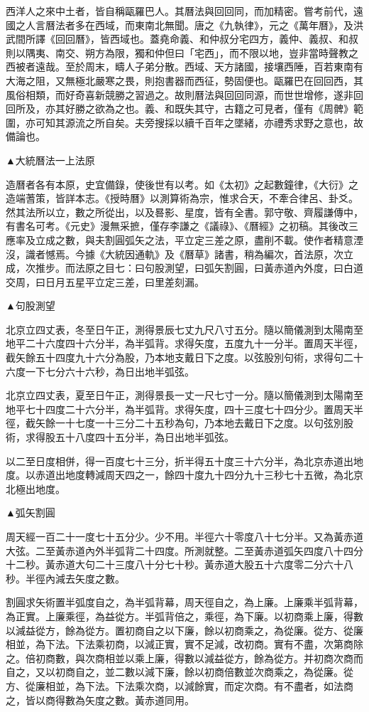 西洋人之來中土者，皆自稱甌羅巴人。其曆法與回回同，而加精密。嘗考前代，遠國之人言曆法者多在西域，而東南北無聞。唐之《九執律》，元之《萬年曆》，及洪武間所譯《回回曆》，皆西域也。蓋堯命義、和仲叔分宅四方，義仲、義叔、和叔則以隅夷、南交、朔方為限，獨和仲但曰「宅西」，而不限以地，豈非當時聲教之西被者遠哉。至於周末，疇人子弟分散。西域、天方諸國，接壤西陲，百若東南有大海之阻，又無極北嚴寒之畏，則抱書器而西征，勢固便也。甌羅巴在回回西，其風俗相類，而好奇喜新競勝之習過之。故則曆法與回回同源，而世世增修，遂非回回所及，亦其好勝之欲為之也。義、和既失其守，古籍之可見者，僅有《周髀》範圍，亦可知其源流之所自矣。夫旁搜採以續千百年之墜緒，亦禮秀求野之意也，故備論也。


▲大統曆法一上法原

造曆者各有本原，史宜備錄，使後世有以考。如《太初》之起數鐘律，《大衍》之造端蓍策，皆詳本志。《授時曆》以測算術為宗，惟求合天，不牽合律呂、卦爻。然其法所以立，數之所從出，以及晷影、星度，皆有全書。郭守敬、齊履謙傳中，有書名可考。《元史》漫無采摭，僅存李謙之《議祿》、《曆經》之初稿。其後改三應率及立成之數，與夫割圓弧矢之法，平立定三差之原，盡削不載。使作者精意湮沒，識者憾焉。今據《大統因通軌》及《曆草》諸書，稍為編次，首法原，次立成，次推步。而法原之目七：曰句股測望，曰弧矢割圓，曰黃赤道內外度，曰白道交周，曰日月五星平立定三差，曰里差刻漏。

▲句股測望

北京立四丈表，冬至日午正，測得景辰七丈九尺八寸五分。隨以簡儀測到太陽南至地平二十六度四十六分半，為半弧背。求得矢度，五度九十一分半。置周天半徑，截矢餘五十四度九十六分為股，乃本地支戴日下之度。以弦股別句術，求得句二十六度一下七分六十六秒，為日出地半弧弦。

北京立四丈表，夏至日午正，測得景長一丈一尺七寸一分。隨以簡儀測到太陽南至地平七十四度二十六分半，為半弧背。求得矢度，四十三度七十四分少。置周天半徑，截矢餘一十七度一十三分二十五秒為句，乃本地去戴日下之度。以句弦別股術，求得股五十八度四十五分半，為日出地半弧弦。

以二至日度相併，得一百度七十三分，折半得五十度三十六分半，為北京赤道出地度。以赤道出地度轉減周天四之一，餘四十度九十四分九十三秒七十五微，為北京北極出地度。

▲弧矢割圓

周天經一百二十一度七十五分少。少不用。半徑六十零度八十七分半。又為黃赤道大弦。二至黃赤道內外半弧背二十四度。所測就整。二至黃赤道弧矢四度八十四分十二秒。黃赤道大句二十三度八十分七十秒。黃赤道大股五十六度零二分六十八秒。半徑內減去矢度之數。

割圓求矢術置半弧度自之，為半弧背幕，周天徑自之，為上廉。上廉乘半弧背幕，為正實。上廉乘徑，為益從方。半弧背倍之，乘徑，為下廉。以初商乘上廉，得數以減益從方，餘為從方。置初商自之以下廉，餘以初商乘之，為從廉。從方、從廉相並，為下法。下法乘初商，以減正實，實不足減，改初商。實有不盡，次第商除之。倍初商數，與次商相並以乘上廉，得數以減益從方，餘為從方。并初商次商而自之，又以初商自之，並二數以減下廉，餘以初商倍數並次商乘之，為從廉。從方、從廉相並，為下法。下法乘次商，以減餘實，而定次商。有不盡者，如法商之，皆以商得數為矢度之數。黃赤道同用。

